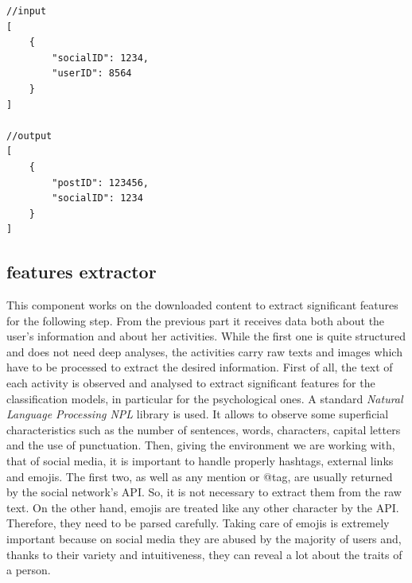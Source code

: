 \begin{multicols}{2}
\begin{verbatim}
//input
[
    {
        "socialID": 1234,
        "userID": 8564
    }
]

//output
[
    {
        "postID": 123456,
        "socialID": 1234
    }
]
\end{verbatim}
\end{multicols}

\subsection{features extractor}
This component works on the downloaded content to extract significant features for the following step.
From the previous part it receives data both about the user's information and about her activities. While the first one is quite structured and does not need deep analyses, the activities carry raw texts and images which have to be processed to extract the desired information.
First of all, the text of each activity is observed and analysed to extract significant features for the classification models, in particular for the psychological ones.
A standard \emph{Natural Language Processing NPL} library is used. It allows to observe some superficial characteristics such as the number of sentences, words, characters, capital letters and the use of punctuation.
Then, giving the environment we are working with, that of social media, it is important to handle properly hashtags, external links and emojis.
The first two, as well as any mention or @tag, are usually returned by the social network's API. So, it is not necessary to extract them from the raw text.
On the other hand, emojis are treated like any other character by the API. Therefore, they need to be parsed carefully.
Taking care of emojis is extremely important because on social media they are abused by the majority of users and, thanks to their variety and intuitiveness, they can reveal a lot about the traits of a person.


